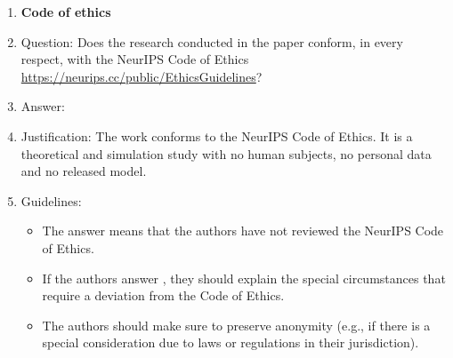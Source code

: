 \begin{enumerate}
\item {\bf Code of ethics}
    \item[] Question: Does the research conducted in the paper conform, in every respect, with the NeurIPS Code of Ethics \url{https://neurips.cc/public/EthicsGuidelines}?
    \item[] Answer: \answerYes{}
    \item[] Justification: The work conforms to the NeurIPS Code of Ethics. It is a theoretical and simulation study with no human subjects, no personal data and no released model.
    \item[] Guidelines:
    \begin{itemize}
        \item The answer \answerNA{} means that the authors have not reviewed the NeurIPS Code of Ethics.
        \item If the authors answer \answerNo, they should explain the special circumstances that require a deviation from the Code of Ethics.
        \item The authors should make sure to preserve anonymity (e.g., if there is a special consideration due to laws or regulations in their jurisdiction).
    \end{itemize}



\end{enumerate}
